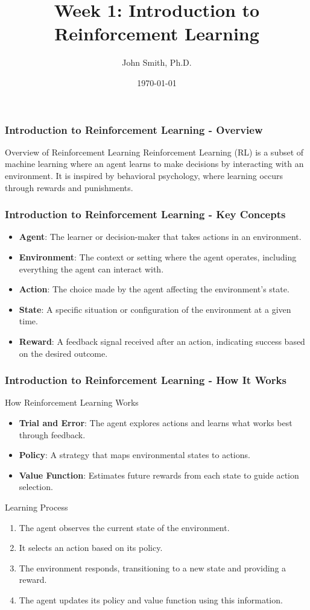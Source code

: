 \documentclass[aspectratio=169]{beamer}
\title[Introduction to Reinforcement Learning]{Week 1: Introduction to Reinforcement Learning}
\author[J. Smith]{John Smith, Ph.D.}
\institute[University Name]{
  Department of Computer Science\\
  University Name\\
  \vspace{0.3cm}
  Email: email@university.edu\\
  Website: www.university.edu
}
\date{\today}
\begin{document}
\frame{\titlepage}

\begin{frame}[fragile]
  \frametitle{Introduction to Reinforcement Learning - Overview}
  \begin{block}{Overview of Reinforcement Learning}
    Reinforcement Learning (RL) is a subset of machine learning where an agent learns to make decisions by interacting with an environment. It is inspired by behavioral psychology, where learning occurs through rewards and punishments.
  \end{block}
\end{frame}

\begin{frame}[fragile]
  \frametitle{Introduction to Reinforcement Learning - Key Concepts}
  \begin{itemize}
    \item \textbf{Agent}: The learner or decision-maker that takes actions in an environment.
    \item \textbf{Environment}: The context or setting where the agent operates, including everything the agent can interact with.
    \item \textbf{Action}: The choice made by the agent affecting the environment's state.
    \item \textbf{State}: A specific situation or configuration of the environment at a given time.
    \item \textbf{Reward}: A feedback signal received after an action, indicating success based on the desired outcome.
  \end{itemize}
\end{frame}

\begin{frame}[fragile]
  \frametitle{Introduction to Reinforcement Learning - How It Works}
  \begin{block}{How Reinforcement Learning Works}
    \begin{itemize}
      \item \textbf{Trial and Error}: The agent explores actions and learns what works best through feedback.
      \item \textbf{Policy}: A strategy that maps environmental states to actions.
      \item \textbf{Value Function}: Estimates future rewards from each state to guide action selection.
    \end{itemize}
  \end{block}

  \begin{block}{Learning Process}
    \begin{enumerate}
      \item The agent observes the current state of the environment.
      \item It selects an action based on its policy.
      \item The environment responds, transitioning to a new state and providing a reward.
      \item The agent updates its policy and value function using this information.
    \end{enumerate}
  \end{block}
\end{frame}
\end{document}
